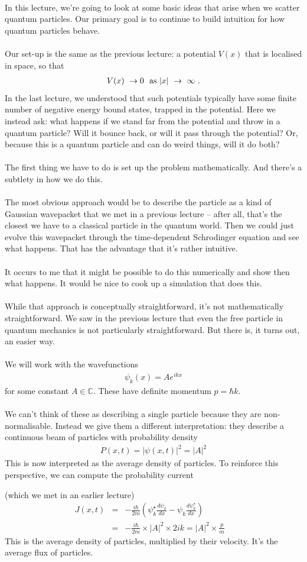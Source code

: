 \documentclass[12pt]{article}
\def\be{\begin{eqnarray}}
\def\ee{\end{eqnarray}}
\newcommand{\nn}{\nonumber}
\newcommand\para{\paragraph{}}
\newcommand{\co}{\color{olive}}
\newcommand{\cblue}{\color{blue}}
\begin{document}
\para
In this lecture, we're going to look at some basic ideas that arise when we scatter quantum particles.  Our primary goal is to continue to build intuition for how quantum particles behave. 




\para
{\co Our set-up is the same as the previous lecture: a potential $V(x)$  that is localised in space, so that
%
\be V(x)\ \rightarrow 0 \ \ {\rm  as}\ |x|\ \rightarrow \ \infty\ .\nn\ee
% 
}
In the last lecture, we understood that such potentials typically have some finite number of negative energy bound states, trapped in the potential. Here we instead ask: what happens if we stand far from the potential and throw in a quantum particle? Will it bounce back, or will it pass through the potential? Or, because this is a  quantum particle and can do weird things, will it do both?




\para
The first thing we have to do is set up the problem mathematically. And there's a subtlety in how we do this.

\para
The most obvious approach would be to describe the particle as a kind of  Gaussian wavepacket that we met in a previous lecture -- after all, that's the closest we have to a classical particle in the quantum world. Then we could just evolve this wavepacket through the time-dependent Schrodinger equation and see what happens. That has the advantage that it's rather intuitive.

\para
{\cblue It occurs to me that it might be possible to do this numerically and show then what happens. It would be nice to cook up a simulation that does this.}

\para
While that approach is conceptually straightforward, it's not mathematically straightforward. We saw in the previous lecture that even the free particle in quantum mechanics is not particularly straightforward. But there is, it turns out, an easier way.

\para
{\co We will work with the wavefunctions
%
\be \psi_k(x) = A  e^{ikx}\nn\ee
%
for some constant $A\in \mathds{C}$. These have definite momentum $p=\hbar k$.

\para
We can't think of these as describing a single particle because they are non-normalisable. Instead we give them a different interpretation: they describe a continuous beam of particles with probability density
%
\be P(x,t) = |\psi(x,t)|^2 =|A|^2\nn\ee
%
This is now interpreted as the average density of particles. To reinforce this perspective, we can compute the probability current} (which we met in an earlier lecture)
%
{\co
\be J(x,t) &=& -\frac{i\hbar}{2m}\left(\psi_k^\star\frac{d\psi_k}{dx} - \psi_k\frac{d\psi_k^\star}{dx}\right) \nn\\&=& -\frac{i\hbar}{2m} \times |A|^2 \times 2ik = |A|^2 \times \frac{p}{m}\ \ \ \ \label{flux}\ee
%
This is the average density of particles,  multiplied by their velocity. It's the average flux of particles.}
\end{document}
